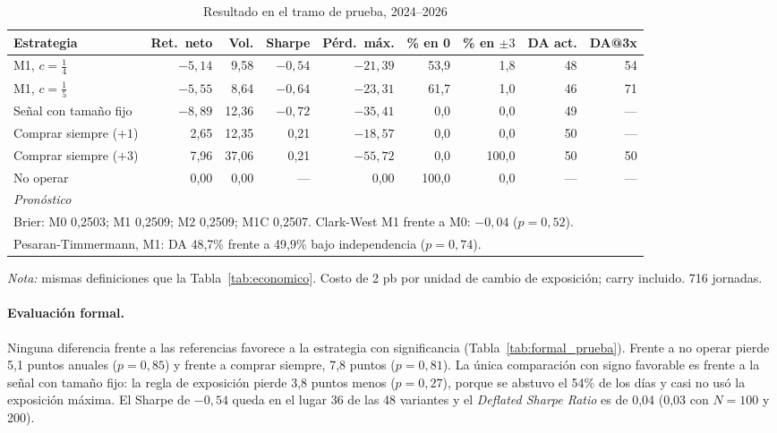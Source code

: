 \documentclass[11pt,a4paper]{article}
\begin{document}
\begin{table}[htbp]\centering\small
\caption{Resultado en el tramo de prueba, 2024--2026}\label{tab:prueba}
\begin{threeparttable}
\begin{tabular}{l rrrr rr rr}
\toprule
Estrategia & Ret.\ neto & Vol. & Sharpe & Pérd.\ máx. & \% en 0 & \% en $\pm3$ & DA act. & DA@3x \\
\midrule
M1, $c=\tfrac14$ & $-5{,}14$ & 9,58 & $-0{,}54$ & $-21{,}39$ & 53,9 & 1,8 & 48 & 54 \\
M1, $c=\tfrac15$ & $-5{,}55$ & 8,64 & $-0{,}64$ & $-23{,}31$ & 61,7 & 1,0 & 46 & 71 \\
Señal con tamaño fijo & $-8{,}89$ & 12,36 & $-0{,}72$ & $-35{,}41$ & 0,0 & 0,0 & 49 & --- \\
Comprar siempre ($+1$) & 2,65 & 12,35 & 0,21 & $-18{,}57$ & 0,0 & 0,0 & 50 & --- \\
Comprar siempre ($+3$) & 7,96 & 37,06 & 0,21 & $-55{,}72$ & 0,0 & 100,0 & 50 & 50 \\
No operar & 0,00 & 0,00 & --- & 0,00 & 100,0 & 0,0 & --- & --- \\
\midrule
\multicolumn{9}{l}{\emph{Pronóstico}} \\
\multicolumn{9}{l}{Brier: M0 0,2503; M1 0,2509; M2 0,2509; M1C 0,2507. Clark-West M1 frente a M0: $-0{,}04$ ($p=0{,}52$).} \\
\multicolumn{9}{l}{Pesaran-Timmermann, M1: DA 48,7\% frente a 49,9\% bajo independencia ($p=0{,}74$).} \\
\bottomrule
\end{tabular}
\begin{tablenotes}\footnotesize
\item \emph{Nota:} mismas definiciones que la Tabla~\ref{tab:economico}. Costo de 2 pb por unidad de cambio de exposición; carry incluido. 716 jornadas.
\end{tablenotes}
\end{threeparttable}
\end{table}

\paragraph{Evaluación formal.} Ninguna diferencia frente a las referencias favorece a la estrategia con significancia (Tabla~\ref{tab:formal_prueba}). Frente a no operar pierde 5,1 puntos anuales (\(p=0{,}85\)) y frente a comprar siempre, 7,8 puntos (\(p=0{,}81\)). La única comparación con signo favorable es frente a la señal con tamaño fijo: la regla de exposición pierde 3,8 puntos menos (\(p=0{,}27\)), porque se abstuvo el 54\% de los días y casi no usó la exposición máxima. El Sharpe de $-0{,}54$ queda en el lugar 36 de las 48 variantes y el \emph{Deflated Sharpe Ratio} es de 0,04 (0,03 con \(N=100\) y 200).
\end{document}

